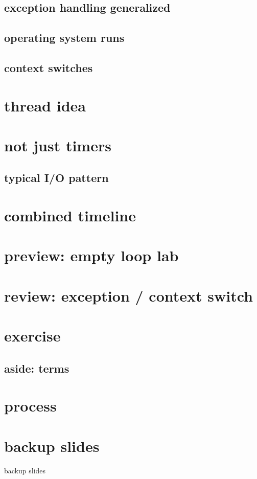 \subsection{exception handling generalized}


\subsection{operating system runs}


\subsection{context switches} 


\section{thread idea}


\section{not just timers}

\subsection{typical I/O pattern}




\section{combined timeline}


\section{preview: empty loop lab}


\section{review: exception / context switch}


\section{exercise}


\subsection{aside: terms}


\section{process}



\section{backup slides}
\begin{frame}{backup slides}
\end{frame}


